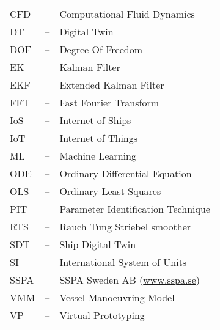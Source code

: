 
\begin{tabular}{ l c l }
CFD & -- & Computational Fluid Dynamics\\
DT  & -- & Digital Twin\\
DOF & -- & Degree Of Freedom\\
EK & -- & Kalman Filter \\
EKF & -- & Extended Kalman Filter \\
FFT & -- & Fast Fourier Transform\\
IoS & -- & Internet of Ships \\
IoT & -- & Internet of Things \\
ML & -- & Machine Learning \\
ODE & -- & Ordinary Differential Equation\\
OLS & -- & Ordinary Least Squares\\
PIT & -- & Parameter Identification Technique\\
RTS & -- & Rauch Tung Striebel smoother \\
SDT  & -- & Ship Digital Twin\\
SI  & -- & International System of Units\\
SSPA & -- & SSPA Sweden AB (\url{www.sspa.se})\\
VMM & -- & Vessel Manoeuvring Model\\
VP & -- & Virtual Prototyping \\
\end{tabular}
